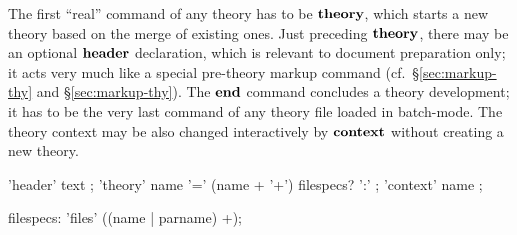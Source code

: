 The first ``real'' command of any theory has to be ${\mathord{\mathbf{theory}}}$, which starts a
new theory based on the merge of existing ones.  Just preceding ${\mathord{\mathbf{theory}}}$,
there may be an optional ${\mathord{\mathbf{header}}}$ declaration, which is relevant
to document preparation only; it acts very much like a special pre-theory
markup command (cf.\ \S\ref{sec:markup-thy} and \S\ref{sec:markup-thy}).  The
${\mathord{\mathbf{end}}}$ command concludes a theory development; it has to be the very last
command of any theory file loaded in batch-mode.  The theory context may be
also changed interactively by ${\mathord{\mathbf{context}}}$ without creating a new theory.

\begin{rail}
  'header' text
  ;
  'theory' name '=' (name + '+') filespecs? ':'
  ;
  'context' name
  ;

  filespecs: 'files' ((name | parname) +);
\end{rail}

